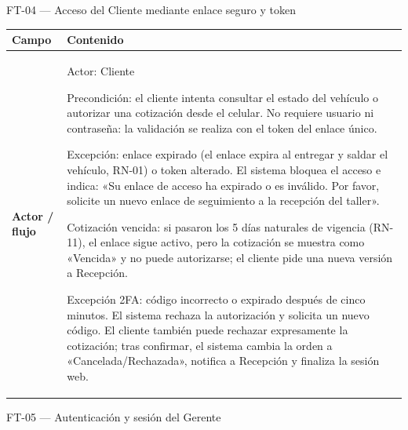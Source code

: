 FT-04 --- Acceso del Cliente mediante enlace seguro y token

{\def\LTcaptype{none} %
\begin{longtable}[]{@{}
  >{\raggedright\arraybackslash}p{}
  >{\raggedright\arraybackslash}p{}@{}}
\toprule\noalign{}
\begin{minipage}[b]{\linewidth}\raggedright
\textbf{Campo}
\end{minipage} & \begin{minipage}[b]{\linewidth}\raggedright
\textbf{Contenido}
\end{minipage} \\
\midrule\noalign{}
\endhead
\bottomrule\noalign{}
\endlastfoot
\textbf{Actor / flujo} & Actor: Cliente

Precondición: el cliente intenta consultar el estado del vehículo o
autorizar una cotización desde el celular. No requiere usuario ni
contraseña: la validación se realiza con el token del enlace único.

Excepción: enlace expirado (el enlace expira al entregar y saldar el
vehículo, RN-01) o token alterado. El sistema bloquea el acceso e
indica: «Su enlace de acceso ha expirado o es inválido. Por favor,
solicite un nuevo enlace de seguimiento a la recepción del taller».

Cotización vencida: si pasaron los 5 días naturales de vigencia (RN-11),
el enlace sigue activo, pero la cotización se muestra como «Vencida» y
no puede autorizarse; el cliente pide una nueva versión a Recepción.

Excepción 2FA: código incorrecto o expirado después de cinco minutos. El
sistema rechaza la autorización y solicita un nuevo código. El cliente
también puede rechazar expresamente la cotización; tras confirmar, el
sistema cambia la orden a «Cancelada/Rechazada», notifica a Recepción y
finaliza la sesión web. \\
\end{longtable}
}

FT-05 --- Autenticación y sesión del Gerente

